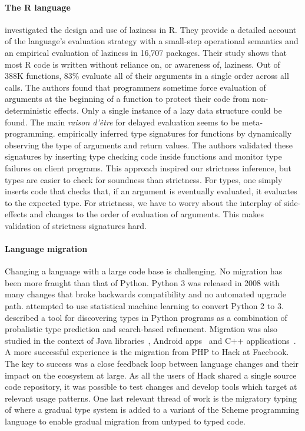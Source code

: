 \documentclass[review,nonacm,screen,acmsmall,anonymous=true]{acmart}
\newcommand{\authorcomment}[3]{}
\newcommand{\OF}[1]{\authorcomment{magenta}{OF}{#1}}
\begin{document}
\paragraph{The R language} \citet{oopsla19b} investigated the design and use of
laziness in R. They provide a detailed account of the language's evaluation
strategy with a small-step operational semantics and an empirical evaluation of
laziness in 16,707 packages. Their study shows that most R code is written
without reliance on, or awareness of, laziness. Out of 388K functions, 83\%
evaluate all of their arguments in a single order across all calls. The authors
found that programmers sometime force evaluation of arguments at the beginning
of a function to protect their code from non-deterministic effects. Only a
single instance of a lazy data structure could be found. The main \emph{raison
d'\^etre} for delayed evaluation seems to be meta-programming. \citet{oopsla20b}
empirically inferred type signatures for functions by dynamically observing the
type of arguments and return values. The authors validated these signatures by
inserting type checking code inside functions and monitor type failures on
client programs. This approach inspired our strictness inference, but types are
easier to check for soundness than strictness. For types, one simply inserts
code that checks that, if an argument is eventually evaluated, it evaluates to
the expected type. For strictness, we have to worry about the interplay of
side-effects and changes to the order of evaluation of arguments. This makes
validation of strictness signatures hard.

\paragraph{Language migration} Changing a language with a large code base
is challenging. No migration has been more fraught than that of Python. Python 3
was released in 2008 with many changes that broke backwards compatibility and no
automated upgrade path. \citet{Agg15} attempted to use statistical machine
learning to convert Python 2 to 3. \citet{Pra20} described a tool for
discovering types in Python programs as a combination of probalistic type
prediction and search-based refinement. Migration was also studied in the context of
Java libraries~\cite{Xu19}, Android apps~\cite{Orso20} and C++
applications~\cite{OB20}. A more successful experience is the migration from PHP
to Hack at Facebook. The key to success was a close feedback loop between
language changes and their impact on the ecosystem at large. As all the users of
Hack shared a single source code repository, it was possible to test changes and
develop tools which target at relevant usage patterns\OF{cite? private
communications?}. One last relevant thread of
work is the migratory typing of \citet{matthias06} where a gradual type system
is added to a variant of the Scheme programming language to enable gradual
migration from untyped to typed code.
\end{document}
